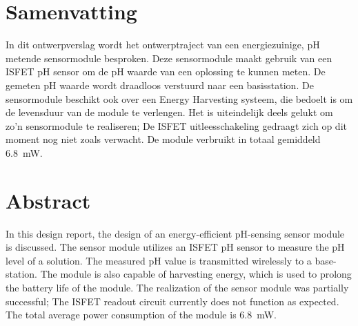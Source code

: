 \section*{Samenvatting}
In dit ontwerpverslag wordt het ontwerptraject van een energiezuinige, pH metende sensormodule besproken. Deze sensormodule maakt gebruik van een ISFET pH sensor om de pH waarde van een oplossing te kunnen meten.
De gemeten pH waarde wordt draadloos verstuurd naar een basisstation. De sensormodule beschikt ook over een Energy Harvesting systeem, die bedoelt is om de levensduur van de module te verlengen.
Het is uiteindelijk deels gelukt om zo'n sensormodule te realiseren; De ISFET uitleesschakeling gedraagt zich op dit moment nog niet zoals verwacht. De module verbruikt in totaal gemiddeld \qty{6.8}{\milli\watt}.

\section*{Abstract}
In this design report, the design of an energy-efficient pH-sensing sensor module is discussed. The sensor module utilizes an ISFET pH sensor to measure the pH level of a solution.
The measured pH value is transmitted wirelessly to a base-station. The module is also capable of harvesting energy, which is used to prolong the battery life of the module.
The realization of the sensor module was partially successful; The ISFET readout circuit currently does not function as expected. The total average power consumption of the module is \qty{6.8}{\milli\watt}.
